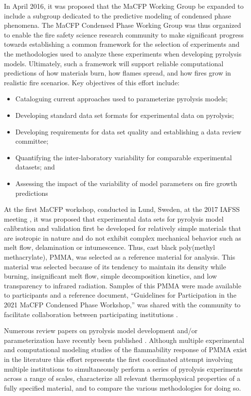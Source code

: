 \documentclass{book}
\begin{document}
In April 2016, it was proposed that the MaCFP Working Group be expanded to include a subgroup dedicated to the predictive modeling of condensed phase phenomena. The MaCFP Condensed Phase Working Group was thus organized to enable the fire safety science research community to make significant progress towards establishing a common framework for the selection of experiments and the methodologies used to analyze these experiments when developing pyrolysis models. Ultimately, such a framework will support reliable computational predictions of how materials burn, how flames spread, and how fires grow in realistic fire scenarios. Key objectives of this effort include:
\begin{itemize}
 \item Cataloguing current approaches used to parameterize pyrolysis models;
 \item Developing standard data set formats for experimental data on pyrolysis;
 \item Developing requirements for data set quality and establishing a data review committee;
 \item Quantifying the inter-laboratory variability for comparable experimental datasets; and
 \item Assessing the impact of the variability of model parameters on fire growth predictions
\end{itemize}
At the first MaCFP workshop, conducted in Lund, Sweden, at the 2017 IAFSS meeting \cite{brown2018proceedings}, it was proposed that experimental data sets for pyrolysis model calibration and validation first be developed for relatively simple materials that are isotropic in nature and do not exhibit complex mechanical behavior such as melt flow, delamination or intumescence. Thus, cast black poly(methyl methacrylate), PMMA, was selected as a reference material for analysis. This material was selected because of its tendency to maintain its density while burning, insignificant melt flow, simple decomposition kinetics, and low transparency to infrared radiation. Samples of this PMMA were made available to participants and a reference document, ``Guidelines for Participation in the 2021 MaCFP Condensed Phase Workshop,'' was shared with the community to facilitate collaboration between participating institutions \cite{MaCFP_Guidelines_for_Part}.

Numerous review papers on pyrolysis model development and/or parameterization have recently been published \cite{nyazika2019pyrolysis,rogaume2019thermal, stoliarov2016parameterization,matala2012generalized}. Although multiple experimental \cite{kashiwagi1982study, hirata1985thermal, tewarson1992fire, rhodes1996burning} and computational modeling studies of the flammability response of PMMA exist in the literature \cite{consalvi2008numerical, leventon2015flame, fukumoto2018large} this effort represents the first coordinated attempt involving multiple institutions to simultaneously perform a series of pyrolysis experiments across a range of scales, characterize all relevant thermophysical properties of a fully specified material, and to compare the various methodologies for doing so.
\end{document}
